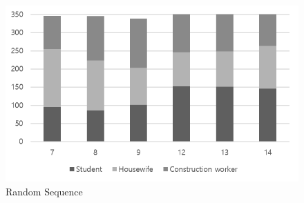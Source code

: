 \documentclass{scsSimAUDPaperFormat}
\begin{document}
\begin{figure}[!h]
    \centering
    \includegraphics[width=1.0\columnwidth]{experiment_result/RandomSequence.png}
    \caption{Random Sequence}
    \label{Fig:Random Sequence}
\end{figure}
\end{document}
